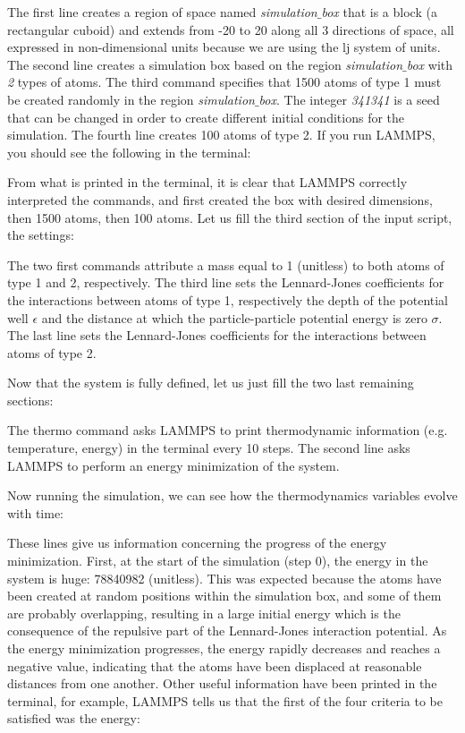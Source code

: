 \vspace{0.5cm} \noindent The first line creates a region of space
named \textit{simulation$\_$box} that is a block (a rectangular cuboid) and
extends from -20 to 20 along all 3 directions of space, all expressed in
non-dimensional units because we are using the lj system
of units. The second line creates a simulation box based on
the region \textit{simulation$\_$box} with \textit{2} types of atoms. The third
command specifies that 1500 atoms of type 1 must be created
randomly in the region \textit{simulation$\_$box}. The integer \textit{341341} is a
seed that can be changed in order to create different
initial conditions for the simulation. The fourth line
creates 100 atoms of type 2.
If you run LAMMPS, you should see the following in the
terminal:

\vspace{0.5cm} \noindent From what is printed in the terminal, it is clear that
LAMMPS correctly interpreted the commands, and first created
the box with desired dimensions, then 1500 atoms, then 100
atoms.
Let us fill the third section of the input script, the settings:

\vspace{0.5cm} \noindent The two first commands attribute a mass
equal to 1 (unitless) to both atoms of type 1 and 2,
respectively. The third line sets the Lennard-Jones
coefficients for the interactions between atoms of type 1,
respectively the depth of the potential well
$\epsilon$ and the distance at which the
particle-particle potential energy is zero $\sigma$. 
The last line sets the Lennard-Jones coefficients for
the interactions between atoms of type 2.

\vspace{0.5cm} \noindent Now that the system is fully defined, let us just fill the two last remaining sections:

\vspace{0.5cm} \noindent The thermo command asks LAMMPS to print
thermodynamic information (e.g. temperature, energy) in the
terminal every 10 steps. The second line asks LAMMPS to
perform an energy minimization of the system.

\vspace{0.5cm} \noindent Now running the simulation, we can see how the thermodynamics
variables evolve with time:

\vspace{0.5cm} \noindent These lines give us information concerning
the progress of the energy minimization. First, at the start
of the simulation (step 0), the energy in the system is
huge: 78840982 (unitless). This was expected because
the atoms have been created at random positions within the
simulation box, and some of them are probably overlapping,
resulting in a large initial energy which is the consequence
of the repulsive part of the Lennard-Jones interaction
potential. As the energy minimization progresses, the energy
rapidly decreases and reaches a negative value, indicating that the atoms have been
displaced at reasonable distances from one another. Other
useful information have been printed in the terminal, for
example, LAMMPS tells us that the first of the four criteria
to be satisfied was the energy:


